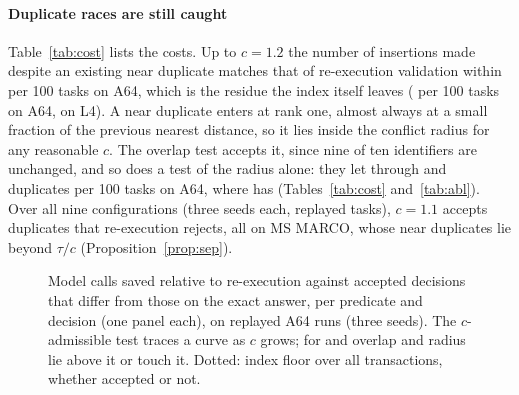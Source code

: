 \documentclass[sigconf, nonacm, review]{acmart}
\begin{document}
\paragraph{Duplicate races are still caught}
Table~\ref{tab:cost} lists the costs. Up to $c=1.2$ the number of
insertions made despite an existing near duplicate matches that of
re-execution validation within  per 100 tasks on A64, which is the residue the index itself leaves
( per 100 tasks on A64,  on
L4). A near duplicate enters at rank one, almost always at a small fraction of the
previous nearest distance, so it lies inside the conflict radius for
any reasonable $c$. The overlap test accepts it, since nine of ten
identifiers are unchanged, and so does a test of the radius alone: they
let through  and 
duplicates per 100 tasks on A64, where  has
 (Tables~\ref{tab:cost} and~\ref{tab:abl}).
Over all nine configurations (three seeds each,  replayed tasks), $c=1.1$
accepts  duplicates that re-execution rejects, all on MS MARCO,
whose near duplicates lie beyond $\tau/c$ (Proposition~\ref{prop:sep}).

\begin{figure}[t]
\centering
{}
\caption{Model calls saved relative to re-execution against accepted
  decisions that differ from those on the exact answer, per predicate and
  decision (one panel each), on replayed A64 runs (three seeds). The
  $c$-admissible test traces a curve as $c$ grows; for  and
   overlap and radius lie above it or touch it. Dotted: index floor over all transactions, whether accepted or not.}
\label{fig:pareto}
\end{figure}
\end{document}
